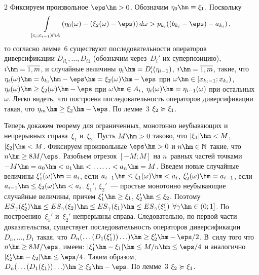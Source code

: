 \begin{multicols}{2}
Фиксируем произвольное $\eps\hm>0$. Обозначим $\eta_0 \hm\equiv \xi_1$. Поскольку
$$
\int\limits_{[c_i;c_{i-1})\cap A}(\eta_0(\omega)-(\xi_2(\omega)-\eps))\,d\omega>p_{k_i}( (b_{k_i} - \eps) - a_{k_i})\,,
$$
то согласно лемме~6 существуют последовательности операторов
диверсификации $D_{il_i},\ldots,D_{i1}$ (обозначим через~$D_i'$ их
суперпозицию), $i\hm=\overline{1,m}$, и случайные величины
$\eta_i\hm=D_i'(\eta_{i-1})$, $i\hm=\overline{1,m}$, такие, что
$\eta_i(\omega)\hm=b_{k_i}\hm-\eps\hm=\xi_2(\omega)\hm-\eps$ при
$\omega \hm\in [x_{k_i-1};x_{k_i})$,
$\eta_i(\omega)\hm\ge\xi_2(\omega)\hm-\eps$ при $\omega \hm\in A_i$,
$\eta_i(\omega)\hm=\eta_{i-1}(\omega)$ при остальных~$\omega$. Легко
видеть, что построена последовательность операторов диверсификации
такая, что $\eta_m\hm\ge\xi_2\hm-\eps$. По лемме~3 $\xi_2 \succcurlyeq \xi_1$.

\smallskip

\noindent
{} Теперь докажем теорему для ограниченных, монотонно
неубывающих и непрерывных справа~$\xi_1$ и~$\xi_2$. Пусть $M\hm>0$
таково, что $|\xi_1| \hm< M$, $|\xi_2|\hm<M$. Фиксируем произвольные
$\eps\hm>0$ и $n\hm\in\mathbb{N}$ такие, что $n\hm\ge 8M/\eps$.
Разобьем отрезок $[-M;M]$ на $n$~равных частей точками
$-M\hm=a_0\hm<a_1\hm<\ldots$\linebreak $\ldots<a_n\hm=M$. Введем новые случайные величины
$\xi_1'(\omega)\hm=a_i$, если $a_{i-1}\hm\le\xi_1(\omega)\hm<a_i$,
$\xi_2'(\omega)\hm=a_{i-1}$, если $a_{i-1}\hm\le\xi_2(\omega)\hm<a_i$.
$\xi_1'$, $\xi_2'$~--- простые монотонно неубывающие случайные величины,
причем $\xi_1'\hm\ge\xi_1$, $\xi_2'\hm\le\xi_2$. Поэтому
${ES}_\gamma(\xi_2')\hm\le{ES}_\gamma(\xi_2)\hm\le{ES}_\gamma(\xi_1)\hm
\le{ES}_\gamma(\xi_1')$
$\forall \gamma\hm\in(0;1]$. По построению~$\xi_1'$ и~$\xi_2'$
непрерывны справа. Следовательно, по первой части доказательства,
существует последовательность операторов диверсификации
$D_n,\ldots,D_1$ такая, что $D_n(\ldots(D_1(\xi_1'))\ldots) \hm\ge
\xi_2' \hm- \eps / 2$. В~силу того что $n\hm\ge 8M/\eps$, имеем:
$|\xi_1'\hm-\xi_1|\hm\le M/n \hm\le \eps/4$ и аналогично $|\xi_2'\hm-\xi_2|\hm\le
\eps/4$. Таким образом, $D_n(\ldots(D_1(\xi_1))\ldots) \hm\ge \xi_2 \hm- \eps $. 
По лемме~3 $\xi_2 \succcurlyeq \xi_1$.

\smallskip


\end{multicols}

